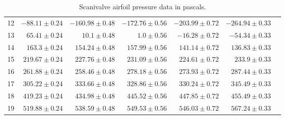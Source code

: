 \documentclass[runningheads]{llncs}
\begin{document}
\begin{table}
\begin{center}
\begin{tabular}{rrrrrrr}
12 &   $-88.11\pm0.24$ &   $-160.98\pm0.48$ &   $-172.76\pm0.56$ &   $-203.99\pm0.72$ &   $-264.94\pm0.33$ \\
13 &    $65.41\pm0.24$ &      $10.1\pm0.48$ &       $1.0\pm0.56$ &    $-16.28\pm0.72$ &    $-54.34\pm0.33$ \\
14 &    $163.3\pm0.24$ &    $154.24\pm0.48$ &    $157.99\pm0.56$ &    $141.14\pm0.72$ &    $136.83\pm0.33$ \\
15 &   $219.67\pm0.24$ &    $227.76\pm0.48$ &    $231.09\pm0.56$ &    $224.61\pm0.72$ &     $233.9\pm0.33$ \\
16 &   $261.88\pm0.24$ &    $258.46\pm0.48$ &    $278.18\pm0.56$ &    $273.93\pm0.72$ &    $287.44\pm0.33$ \\
17 &    $305.22\pm0.24$ &    $333.66\pm0.48$ &    $328.86\pm0.56$ &    $330.24\pm0.72$ &    $345.49\pm0.33$ \\
18 &   $419.23\pm0.24$ &    $434.98\pm0.48$ &    $445.52\pm0.56$ &    $447.85\pm0.72$ &    $455.49\pm0.33$ \\
19 &   $519.88\pm0.24$ &    $538.59\pm0.48$ &    $549.53\pm0.56$ &    $546.03\pm0.72$ &    $567.24\pm0.33$ \\
\bottomrule
\end{tabular}
\end{center}
\caption{Scanivalve airfoil pressure data in pascals.}
\label{tab:pressure_scanivalve_airfoil}
\end{table}
\end{document}
